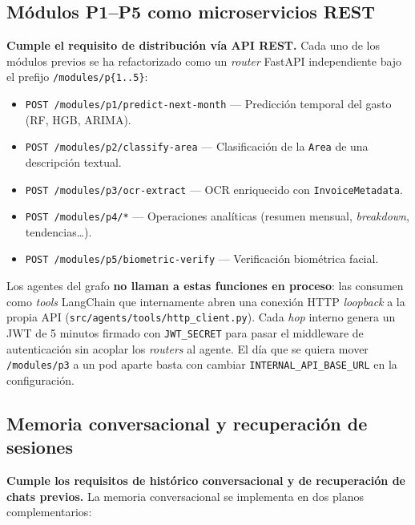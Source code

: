 \subsection{Módulos P1--P5 como microservicios REST}
\label{subsec:microservicios}

\textbf{Cumple el requisito de distribución vía API REST.}
Cada uno de los módulos previos se ha refactorizado como un
\textit{router} FastAPI independiente bajo el prefijo
\texttt{/modules/p\{1..5\}}:

\begin{itemize}[leftmargin=1.5em,itemsep=0.2em]
  \item \texttt{POST /modules/p1/predict-next-month} --- Predicción
        temporal del gasto (RF, HGB, ARIMA).
  \item \texttt{POST /modules/p2/classify-area} --- Clasificación de
        la \texttt{Area} de una descripción textual.
  \item \texttt{POST /modules/p3/ocr-extract} --- OCR enriquecido con
        \texttt{InvoiceMetadata}.
  \item \texttt{POST /modules/p4/*} --- Operaciones analíticas
        (resumen mensual, \textit{breakdown}, tendencias\dots).
  \item \texttt{POST /modules/p5/biometric-verify} --- Verificación
        biométrica facial.
\end{itemize}

Los agentes del grafo \textbf{no llaman a estas funciones en proceso}:
las consumen como \textit{tools} LangChain que internamente abren una
conexión HTTP \textit{loopback} a la propia API
(\texttt{src/agents/tools/http\_client.py}). Cada \textit{hop} interno
genera un JWT de 5 minutos firmado con \texttt{JWT\_SECRET} para
pasar el middleware de autenticación sin acoplar los \textit{routers}
al agente. El día que se quiera mover \texttt{/modules/p3} a un pod aparte basta con cambiar
\texttt{INTERNAL\_API\_BASE\_URL} en la configuración.

\subsection{Memoria conversacional y recuperación de sesiones}
\label{subsec:memoria-conversacional}

\textbf{Cumple los requisitos de histórico conversacional y de
recuperación de chats previos.}
La memoria conversacional se implementa en dos planos complementarios:

